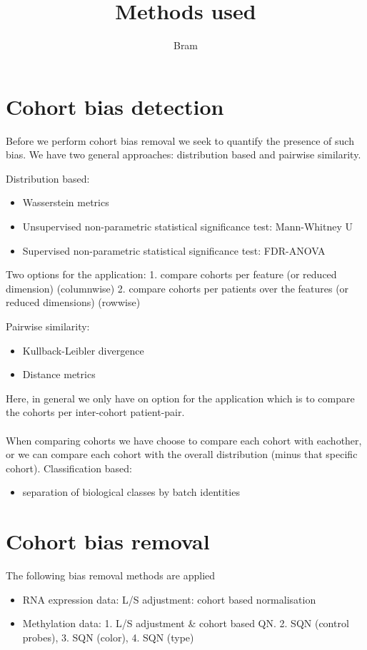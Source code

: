 \documentclass[a4paper,10pt]{article}
\title{Methods used}
\author{Bram}
\begin{document}
\section{Cohort bias detection}
%
Before we perform cohort bias removal we seek to quantify the presence of such bias.
We have two general approaches: distribution based and pairwise similarity.

Distribution based: 
\begin{itemize}
 \item Wasserstein metrics
 \item Unsupervised non-parametric statistical significance test: Mann-Whitney U
 \item Supervised non-parametric statistical significance test: FDR-ANOVA
\end{itemize}
%
Two options for the application:
1. compare cohorts per feature (or reduced dimension) (columnwise)
2. compare cohorts per patients over the features (or reduced dimensions) (rowwise)

Pairwise similarity:
\begin{itemize}
 \item Kullback-Leibler divergence
 \item Distance metrics 
\end{itemize}
%
Here, in general we only have on option for the application which is to compare the cohorts per inter-cohort patient-pair.\\\\
When comparing cohorts we have choose to compare each cohort with eachother, or we can compare each cohort with the overall distribution (minus that specific cohort).
%
Classification based:
\begin{itemize}
 \item separation of biological classes by batch identities
\end{itemize}

%
\section{Cohort bias removal}
%
The following bias removal methods are applied
%
\begin{itemize}
\item RNA expression data: L/S adjustment: cohort based normalisation
\item Methylation data: 1. L/S adjustment & cohort based QN. 2. SQN (control probes), 3. SQN (color), 4. SQN (type)
\end{itemize}
\end{document}
